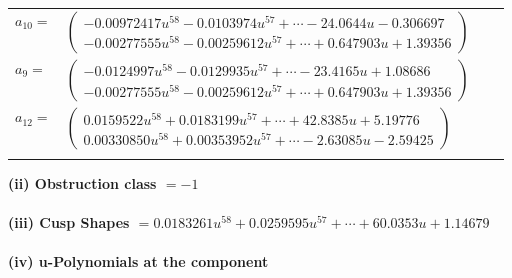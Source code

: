 \documentclass[1p]{elsarticle_modified}
\theoremstyle{definition}
\begin{document}
\begin{tabular}{m{7pt} m{180pt} m{7pt} m{180pt} }
\flushright $a_{10}=$&$\begin{pmatrix}-0.00972417 u^{58}-0.0103974 u^{57}+\cdots-24.0644 u-0.306697\\-0.00277555 u^{58}-0.00259612 u^{57}+\cdots+0.647903 u+1.39356\end{pmatrix}$ \\
\flushright $a_{9}=$&$\begin{pmatrix}-0.0124997 u^{58}-0.0129935 u^{57}+\cdots-23.4165 u+1.08686\\-0.00277555 u^{58}-0.00259612 u^{57}+\cdots+0.647903 u+1.39356\end{pmatrix}$ \\
\flushright $a_{12}=$&$\begin{pmatrix}0.0159522 u^{58}+0.0183199 u^{57}+\cdots+42.8385 u+5.19776\\0.00330850 u^{58}+0.00353952 u^{57}+\cdots-2.63085 u-2.59425\end{pmatrix}$\\&\end{tabular}
\flushleft \textbf{(ii) Obstruction class $= -1$}\\~\\
\flushleft \textbf{(iii) Cusp Shapes $= 0.0183261 u^{58}+0.0259595 u^{57}+\cdots+60.0353 u+1.14679$}\\~\\
\newpage\renewcommand{\arraystretch}{1}
\flushleft \textbf{(iv) u-Polynomials at the component}\newline \\
\end{document}
